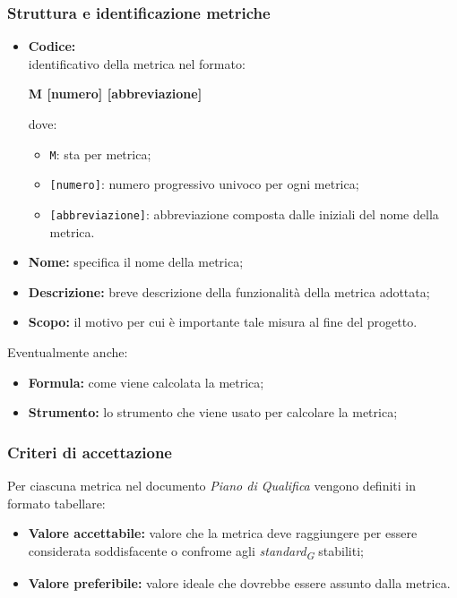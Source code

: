\subsubsection{Struttura e identificazione metriche}
\begin{itemize}
    \item \textbf{Codice:} \\
    identificativo della metrica nel formato:
        \begin{center}
            \textbf{M [numero] [abbreviazione]}
        \end{center}
        dove:
        \begin{itemize}
            \item \texttt{M}: sta per metrica;
            \item \texttt{[numero]}: numero progressivo univoco per ogni metrica;
            \item \texttt{[abbreviazione]}: abbreviazione composta dalle iniziali del nome della metrica.
        \end{itemize}
    \item \textbf{Nome:} specifica il nome della metrica;
    \item \textbf{Descrizione:} breve descrizione della funzionalità della metrica adottata;
    \item \textbf{Scopo:} il motivo per cui è importante tale misura al fine del progetto.
\end{itemize}
    \vspace{0.2cm}
Eventualmente anche:
\begin{itemize}
    \item \textbf{Formula:} come viene calcolata la metrica;
    \item \textbf{Strumento:} lo strumento che viene usato per calcolare la metrica;
\end{itemize}

\subsubsection{Criteri di accettazione}
Per ciascuna metrica nel documento \textit{Piano di Qualifica} vengono definiti in formato tabellare:
\begin{itemize}
    \item \textbf{Valore accettabile:} valore che la metrica deve raggiungere per essere considerata soddisfacente o confrome agli \textit{standard}\textsubscript{\textit{G}} stabiliti;
    \item \textbf{Valore preferibile:} valore ideale che dovrebbe essere assunto dalla metrica.
\end{itemize}

